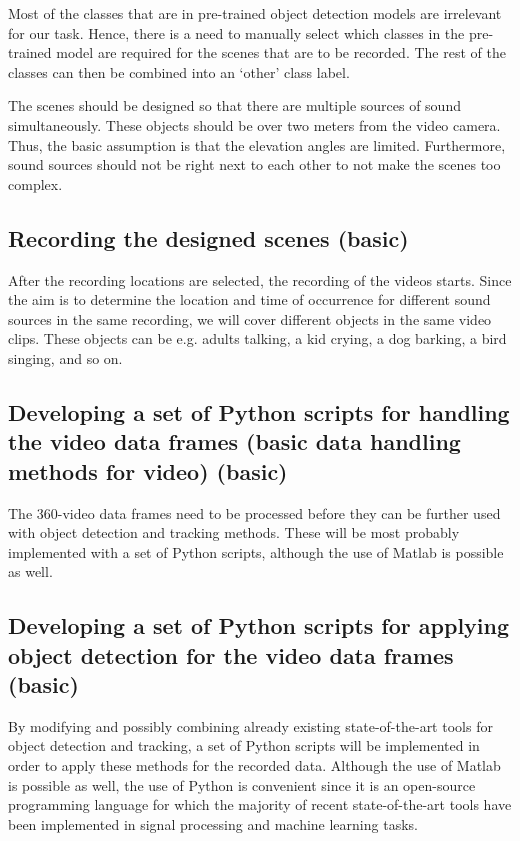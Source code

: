 Most of the classes that are in pre-trained object detection models are irrelevant for our task. Hence, there is a
need to manually select which classes in the pre-trained model are required for the scenes that are to be 
recorded. The rest of the classes can then be combined into an `other' class label.

The scenes should be designed so that there are multiple sources of sound simultaneously. These objects should
be over two meters from the video camera. Thus, the basic assumption is that the elevation angles are limited.
Furthermore, sound sources should not be right next to each other to not make the scenes too complex.

\subsection{Recording the designed scenes (basic)}

After the recording locations are selected, the recording of the videos starts. Since the aim is to determine 
the location and time of occurrence for different sound sources in the same recording, we will cover different
objects in the same video clips. These objects can be e.g. adults talking, a kid crying, a dog barking, a bird
singing, and so on.

\subsection{Developing a set of Python scripts for handling the video data frames (basic data handling methods for video) (basic)}

The 360-video data frames need to be processed before they can be further used with object detection and
tracking methods. These will be most probably implemented with a set of Python scripts, although the use of Matlab
is possible as well.

\subsection{Developing a set of Python scripts for applying object detection for the video data frames (basic)}

By modifying and possibly combining already existing state-of-the-art tools for object detection and tracking, a
set of Python scripts will be implemented in order to apply these methods for the recorded data. Although the use
of Matlab is possible as well, the use of Python is convenient since it is an open-source programming language for
which the majority of recent state-of-the-art tools have been implemented in signal processing and machine 
learning tasks.

